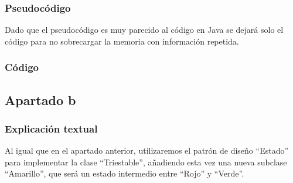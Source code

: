 \documentclass[11pt,a4paper]{article}
\begin{document}
\begin{figure}[H]
\end{figure}


\subsubsection{Pseudocódigo}

Dado que el pseudocódigo es muy parecido al código en Java se dejará solo el código para no sobrecargar la memoria con información repetida.

\subsubsection{Código}









\subsection{Apartado b}

\subsubsection{Explicación textual}

Al igual que en el apartado anterior, utilizaremos el patrón de diseño ``Estado'' para implementar la clase ``Triestable'', añadiendo esta vez una nueva subclase ``Amarillo'', que será un estado intermedio entre ``Rojo'' y ``Verde''.
\end{document}
